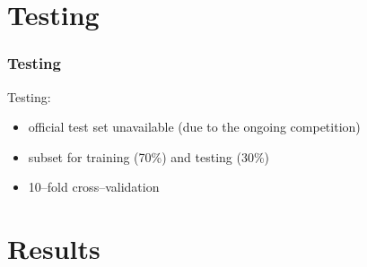 \documentclass[utf8]{beamer}
\begin{document}
\section{Testing}
\begin{frame}
	\frametitle{Testing}
	Testing:
	\pause
	\begin{itemize}
		\item official test set unavailable (due to the ongoing competition)
		\item subset for training (70\%) and testing (30\%)
		\item 10–fold cross–validation
	\end{itemize}
\end{frame}
\section{Results}
\end{document}
